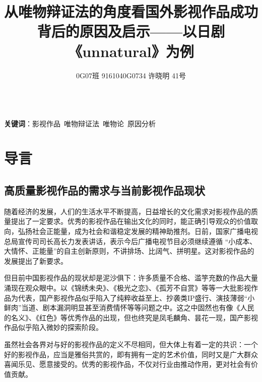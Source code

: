 \documentclass[12pt]{article}%
\title{从唯物辩证法的角度看国外影视作品成功背后的原因及启示——以日剧《unnatural》为例}
\author{0G07班 9161040G0734 许晓明 41号}
\date{}
\begin{document}

\renewcommand{\contentsname}{\centering 目录}
\renewcommand{\tablename}{表}
\renewcommand{\figurename}{图}
\renewcommand\refname{参考文献}
\renewcommand\appendix{\setcounter{secnumdepth}{0}}
\renewcommand\abstractname{摘要}



\maketitle

\\ 

\textbf{关键词}：影视作品\ 唯物辩证法\ 唯物论\ 原因分析 
\newpage
\tableofcontents
\newpage
\section{导言}

\subsection{高质量影视作品的需求与当前影视作品现状}
随着经济的发展，人们的生活水平不断提高，日益增长的文化需求对影视作品的质量提出了一定要求。优秀的影视作品在输出文化的同时，能正确引导观众的价值取向，弘扬社会正能量，成为社会和谐稳定发展的精神助推剂。日前，国家广播电视总局宣传司司长高长力发表讲话，表示今后广播电视节目必须继续遵循 “小成本、大情怀、正能量”的自主创新原则，不讲排场、比阔气、拼明星。这对影视作品的发展提出了新要求。

但目前中国影视作品的现状却是泥沙俱下：许多质量不合格、滥竽充数的作品大量涌现在观众眼中。以《锦绣未央》、《极光之恋》、《孤芳不自赏》等等一大批影视作品为代表，国产影视作品似乎陷入了纯粹收益至上、抄袭类IP盛行、演技薄弱“小鲜肉”当道、剧本漏洞明显甚至消费情怀等等问题之中。这之中固然也有像《人民的名义》、《红色》等优秀作品的出现，但也终究是凤毛麟角、昙花一现，国产影视作品似乎陷入微妙的探索阶段。

虽然社会各界对与好的影视作品的定义不尽相同，但大体上有着一定的共识：一个好的影视作品，应当是雅俗共赏的，即有拥有一定的艺术价值，同时又是广大群众喜闻乐见、愿意接受的。优秀的影视作品，不仅对行业由推动作用，更对社会有价值贡献。
\end{document}
